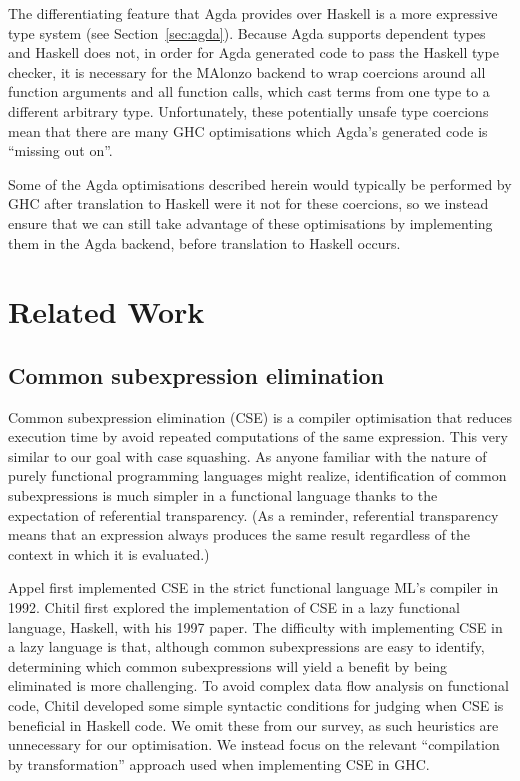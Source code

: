 The differentiating feature that Agda provides over Haskell is a more expressive type system (see Section~\ref{sec:agda}). Because Agda supports dependent types and Haskell does not, in order for Agda generated code to pass the Haskell type checker, it is necessary for the MAlonzo backend to wrap coercions around all function arguments and all function calls, which cast terms from one type to a different arbitrary type. Unfortunately, these potentially unsafe type coercions mean that there are many GHC optimisations which Agda's generated code is ``missing out on''.\cite{fredriksson2011}

Some of the Agda optimisations described herein would typically be performed by GHC after translation to Haskell were it not for these coercions, so we instead ensure that we can still take advantage of these optimisations by implementing them in the Agda backend, before translation to Haskell occurs.


\section{Related Work}
\label{sec:related_work}

\subsection{Common subexpression elimination}

Common subexpression elimination (CSE) is a compiler optimisation that reduces execution time by avoid repeated computations of the same expression.\cite{chitil1997} This very similar to our goal with case squashing. As anyone familiar with the nature of purely functional programming languages might realize, identification of common subexpressions is much simpler in a functional language thanks to the expectation of referential transparency.\cite{chitil1997} (As a reminder, referential transparency means that an expression always produces the same result regardless of the context in which it is evaluated.)

Appel first implemented CSE in the strict functional language ML's compiler in 1992.\cite{appel1992} Chitil first explored the implementation of CSE in a lazy functional language, Haskell, with his 1997 paper.\cite{chitil1997} The difficulty with implementing CSE in a lazy language is that, although common subexpressions are easy to identify, determining which common subexpressions will yield a benefit by being eliminated is more challenging. To avoid complex data flow analysis on functional code, Chitil developed some simple syntactic conditions for judging when CSE is beneficial in Haskell code.\cite{chitil1997} We omit these from our survey, as such heuristics are unnecessary for our optimisation. We instead focus on the relevant ``compilation by transformation'' approach used when implementing CSE in GHC.

